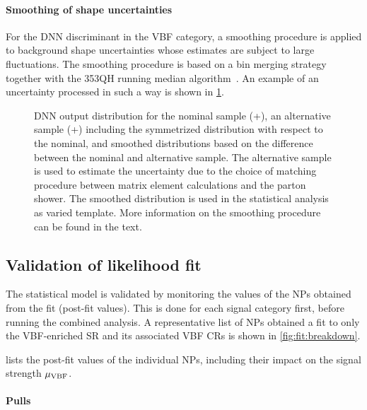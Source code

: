 \paragraph{Smoothing of shape uncertainties}
For the DNN discriminant in the VBF category, a smoothing procedure is applied to background shape uncertainties whose estimates are subject to large fluctuations. 
The smoothing procedure is based on a bin merging strategy together with the 353QH running median algorithm~\cite{Friedman353QH}. 
An example of an uncertainty processed in such a way is shown in \cref{fig:dnn:smoothing}.
\begin{figure}[th]
    \centering
    {\caption{DNN output distribution for the nominal \ttbar sample (\Powheg+\PYTHIAV), an alternative sample (\aMCATNLO+\PYTHIAV) including the symmetrized distribution with respect to the nominal, and smoothed distributions based on the difference between the nominal and alternative sample. The alternative sample is used to estimate the uncertainty due to the choice of matching procedure between matrix element calculations and the parton shower. The smoothed distribution is used in the statistical analysis as varied template. More information on the smoothing procedure can be found in the text.
    \label{fig:dnn:smoothing} }}
\end{figure}

\subsection{Validation of likelihood fit}
The statistical model is validated by monitoring the values of the NPs obtained from the fit (post-fit values). 
This is done for each signal category first, before running the combined analysis. A representative list of NPs obtained a fit to only the VBF-enriched \TwoJet SR and its associated VBF CRs is shown in \cref{fig:fit:breakdown}. 


 lists the post-fit values of the individual NPs, including their impact on the signal strength $\mu_{\rm VBF}$.
\paragraph{Pulls}

